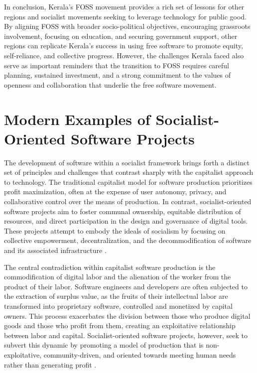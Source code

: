 \begin{refsection}
In conclusion, Kerala’s FOSS movement provides a rich set of lessons for other regions and socialist movements seeking to leverage technology for public good. By aligning FOSS with broader socio-political objectives, encouraging grassroots involvement, focusing on education, and securing government support, other regions can replicate Kerala’s success in using free software to promote equity, self-reliance, and collective progress. However, the challenges Kerala faced also serve as important reminders that the transition to FOSS requires careful planning, sustained investment, and a strong commitment to the values of openness and collaboration that underlie the free software movement.

\section{Modern Examples of Socialist-Oriented Software Projects}

The development of software within a socialist framework brings forth a distinct set of principles and challenges that contrast sharply with the capitalist approach to technology. The traditional capitalist model for software production prioritizes profit maximization, often at the expense of user autonomy, privacy, and collaborative control over the means of production. In contrast, socialist-oriented software projects aim to foster communal ownership, equitable distribution of resources, and direct participation in the design and governance of digital tools. These projects attempt to embody the ideals of socialism by focusing on collective empowerment, decentralization, and the decommodification of software and its associated infrastructure \cite[pp.~45-67]{marx2018}.

The central contradiction within capitalist software production is the commodification of digital labor and the alienation of the worker from the product of their labor. Software engineers and developers are often subjected to the extraction of surplus value, as the fruits of their intellectual labor are transformed into proprietary software, controlled and monetized by capital owners. This process exacerbates the division between those who produce digital goods and those who profit from them, creating an exploitative relationship between labor and capital. Socialist-oriented software projects, however, seek to subvert this dynamic by promoting a model of production that is non-exploitative, community-driven, and oriented towards meeting human needs rather than generating profit \cite[pp.~102-145]{scholz2017}.


\end{refsection}
